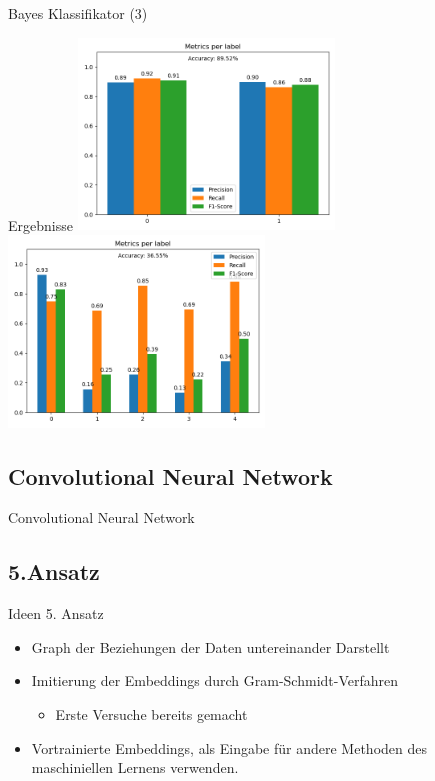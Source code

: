 \documentclass[aspectratio=169]{beamer} %
\begin{document}
\begin{frame}{Bayes Klassifikator (3)}
    \begin{block}{Ergebnisse}
        \includegraphics[width=6.8cm]{figures/evaluation_nbb.png} \includegraphics[width=6.8cm]{figures/evaluation_nbm.png}
    \end{block}
\end{frame}

\subsection{Convolutional Neural Network}

\begin{frame}{Convolutional Neural Network}

\end{frame}

\subsection{5.Ansatz}
\begin{frame}
\begin{block}{Ideen 5. Ansatz}

  
  \begin{itemize}
    \item Graph der Beziehungen der Daten untereinander Darstellt
    \item Imitierung der Embeddings durch Gram-Schmidt-Verfahren 
    \begin{itemize}
   \item Erste Versuche bereits gemacht
   \end{itemize}
    \item Vortrainierte Embeddings, als Eingabe f\"ur andere Methoden des maschiniellen Lernens verwenden.
  \end{itemize}
  \end{block}
\end{frame}
\end{document}

